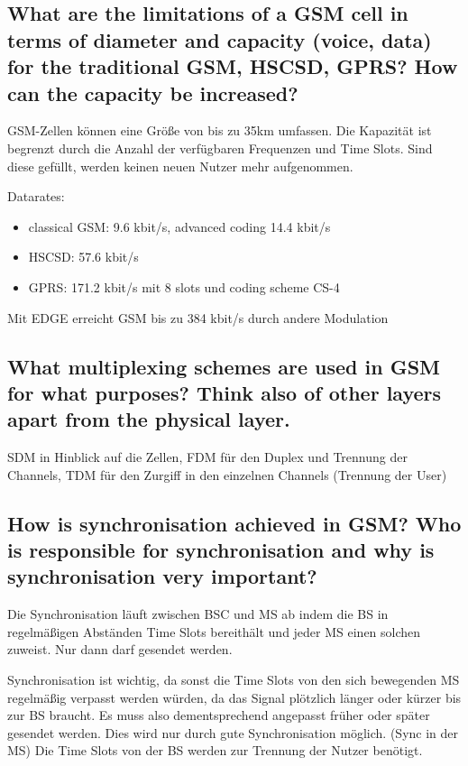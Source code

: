 \subsection{What are the limitations of a GSM cell in terms of diameter and capacity (voice, data)
for the traditional GSM, HSCSD, GPRS? How can the capacity be increased?}

GSM-Zellen können eine Größe von bis zu 35km umfassen. Die Kapazität ist begrenzt durch die Anzahl der verfügbaren Frequenzen und Time Slots. Sind diese gefüllt, werden keinen neuen Nutzer mehr aufgenommen.

Datarates:

\begin{itemize}
\item classical GSM: 9.6 kbit/s, advanced coding 14.4 kbit/s

\item HSCSD: 57.6 kbit/s 

\item GPRS: 171.2 kbit/s mit 8 slots und coding scheme CS-4
\end{itemize}

Mit EDGE erreicht GSM bis zu 384 kbit/s durch andere Modulation

\subsection{What multiplexing schemes are used in GSM for what purposes? Think also of other
layers apart from the physical layer.}

SDM in Hinblick auf die Zellen, FDM für den Duplex und Trennung der Channels, TDM für den Zurgiff in den einzelnen Channels (Trennung der User)

\subsection{How is synchronisation achieved in GSM? Who is responsible for synchronisation
and why is synchronisation very important?}

Die Synchronisation läuft zwischen BSC und MS ab indem die BS in regelmäßigen Abständen Time Slots bereithält und jeder MS einen solchen zuweist. Nur dann darf gesendet werden.

Synchronisation ist wichtig, da sonst die Time Slots von den sich bewegenden MS regelmäßig verpasst werden würden, da das Signal plötzlich länger oder kürzer bis zur BS braucht. Es muss also dementsprechend angepasst früher oder später gesendet werden. Dies wird nur durch gute Synchronisation möglich. (Sync in der MS)
Die Time Slots von der BS werden zur Trennung der Nutzer benötigt.


